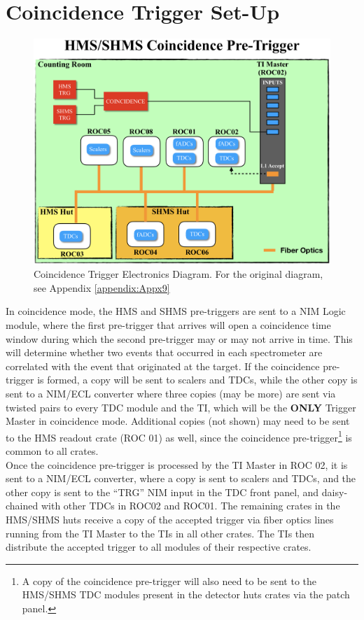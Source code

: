 \documentclass[11pt]{article}
\begin{document}
\section{Coincidence Trigger Set-Up}
\begin{figure}[h!]
  \centering
  \includegraphics[scale=0.5]{Coin_diagram.png}
  \caption{Coincidence Trigger Electronics Diagram. For the original diagram, see Appendix \ref{appendix:Appx9}}
  \label{fig:Coin_TRG}
\end{figure}
\indent In coincidence mode, the HMS and SHMS pre-triggers are sent to a NIM Logic module, where the first pre-trigger that arrives will open
a coincidence time window during which the second pre-trigger may or may not arrive in time. This will determine whether two events that occurred in
each spectrometer are correlated with the event that originated at the target. If the coincidence pre-trigger is formed, a copy will be sent to
scalers and TDCs, while the other copy is sent to a NIM/ECL converter where three copies (may be more) are sent via twisted pairs to every TDC module and the TI, which will be the \textbf{ONLY} Trigger Master in coincidence mode. Additional copies (not shown) may need to be sent to the HMS readout crate (ROC 01) as well, since the coincidence pre-trigger\footnote{A copy of the coincidence pre-trigger will also need to be sent to the
  HMS/SHMS TDC modules present in the detector huts crates via the patch panel.} is common to all crates. \\
\indent Once the coincidence pre-trigger is processed by the TI Master in ROC 02, it is sent to a NIM/ECL converter, where a copy is sent to scalers and TDCs, and the other copy is sent to the ``TRG'' NIM input in the TDC front panel, and daisy-chained with other TDCs in ROC02 and ROC01. The remaining crates in the HMS/SHMS huts receive a copy of the accepted trigger via fiber optics lines running from the TI Master to the TIs in all other crates. The TIs then distribute the accepted trigger to all modules of their respective crates. 
\newpage
\onecolumn


\end{document}
